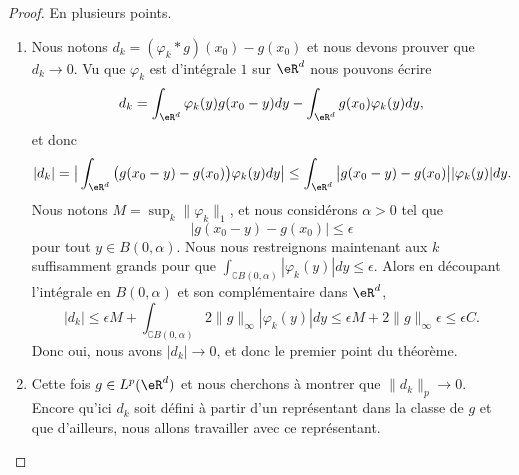 \begin{proof}
	En plusieurs points.
	\begin{enumerate}
		\item
		      Nous notons \( d_k=(\varphi_k*g)(x_0)-g(x_0)\) et nous devons prouver que \( d_k\to 0\). Vu que \( \varphi_k\) est d'intégrale \( 1\) sur \( \eR^d\) nous pouvons écrire
		      \begin{equation}
			      d_k=\int_{\eR^d}\varphi_k(y)g(x_0-y)dy-\int_{\eR^d}g(x_0)\varphi_k(y)dy,
		      \end{equation}
		      et donc
		      \begin{equation}
			      |d_k|=\big| \int_{\eR^d}\big( g(x_0-y)-g(x_0) \big)\varphi_k(y)dy\big|\leq\int_{\eR^d}\big| g(x_0-y)-g(x_0) \big| |\varphi_k(y) |dy.
		      \end{equation}
		      Nous notons \( M=\sup_k\| \varphi_k \|_1\), et nous considérons \( \alpha>0\) tel que
		      \begin{equation}
			      \big| g(x_0-y)-g(x_0) \big|\leq \epsilon
		      \end{equation}
		      pour tout \( y\in B(0,\alpha)\). Nous nous restreignons maintenant aux \( k\) suffisamment grands pour que \( \int_{\complement B(0,\alpha)}| \varphi_k(y) |dy\leq \epsilon\). Alors en découpant l'intégrale en \( B(0,\alpha)\) et son complémentaire dans \( \eR^d\),
		      \begin{equation}
			      | d_k |\leq \epsilon M+\int_{\complement B(0,\alpha)} 2\| g \|_{\infty}| \varphi_k(y) |dy  \leq \epsilon M+2\| g \|_{\infty}\epsilon\leq \epsilon C.
		      \end{equation}
		      Donc oui, nous avons \( | d_k |\to 0\), et donc le premier point du théorème.

		\item

		      Cette fois \( g\in L^p(\eR^d)\) et nous cherchons à montrer que \( \| d_k \|_p\to 0\). Encore qu'ici \( d_k\) soit défini à partir d'un représentant dans la classe de \( g\) et que d'ailleurs, nous allons travailler avec ce représentant.


\end{enumerate}
\end{proof}
